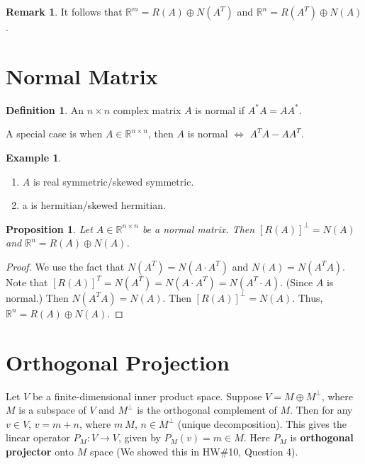\documentclass[12pt]{article}
\newtheorem*{proposition}{Proposition}
\theoremstyle{definition}
\newtheorem*{definition}{Definition}
\newtheorem*{example}{Example}
\newtheorem*{remark}{Remark}
\begin{document}
\begin{remark}
It follows that $\mathbb{R}^m = R(A) \oplus N(A^T)$ and $\mathbb{R}^n = R(A^T) \oplus N(A)$.
\end{remark}

\section{Normal Matrix}

\begin{definition}
An $n \times n$ complex matrix $A$ is normal if $A^* A = A A^*$.
\end{definition}

A special case is when $A \in \mathbb{R}^{n \times n}$, then $A$ is normal $\iff$ 
$A^T A - A A^T$.

\begin{example}
\begin{enumerate}[label = (\arabic*)]
\item $A$ is real symmetric/skewed symmetric.
\item a is hermitian/skewed hermitian.
\end{enumerate}
\end{example}

\begin{proposition}
Let $A \in \mathbb{R}^{n \times n}$ be a normal matrix. Then $[R(A)]^{\perp} = N(A)$ and
$\mathbb{R}^n = R(A) \oplus N(A)$.
\end{proposition}

\begin{proof}
We use the fact that $N(A^T) = N(A \cdot A^T)$ and $N(A) = N(A^T A)$. Note that
$[R(A)]^T = N(A^T) = N(A \cdot A^T) = N(A^T \cdot A)$. (Since $A$ is normal.) Then
$N(A^T A) = N(A)$. Then $[R(A)]^{\perp} = N(A)$. Thus, $\mathbb{R}^n = R(A) \oplus N(A)$.
\end{proof}

\section{Orthogonal Projection}

Let $V$ be a finite-dimensional inner product space. Suppose $V = M \oplus M^{\perp}$,
where $M$ is a subspace of $V$ and $M^{\perp}$ is the orthogonal complement of $M$. Then
for any $v \in V$, $v = m + n$, where $m \ M$, $n \in M^{\perp}$ (unique decomposition).
This gives the linear operator $P_M : V \rightarrow V$, given by $P_M (v) = m \in M$. Here
$P_M$ is \textbf{orthogonal projector} onto $M$ space (We showed this in HW\#10, Question 4).
\end{document}
